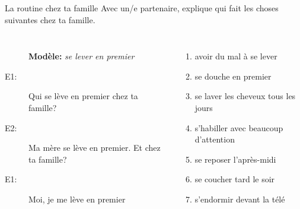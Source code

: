\begin{frame}{La routine chez ta famille}
  Avec un/e partenaire, explique qui fait les choses suivantes chez ta famille. \\
  \begin{columns}[t]
      \begin{description}
        \item[] \textbf{Modèle:} \emph{se lever en premier}
        \item[E1:] Qui se lève en premier chez ta famille?
        \item[] 
        \item[E2:] Ma mère se lève en premier. Et chez ta famille?
        \item[] 
        \item[E1:] Moi, je me lève en premier
        \item[] 
      \end{description}
      \begin{enumerate}
        \item avoir du mal  à se lever
        \item se douche en premier
        \item se laver les cheveux tous les jours
        \item s'habiller avec beaucoup d'attention
        \item se reposer l'après-midi
        \item se coucher tard le soir
        \item s'endormir devant la télé
      \end{enumerate}
  \end{columns}
\end{frame}